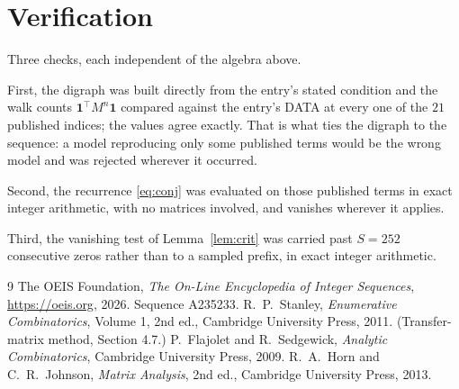 \documentclass[11pt,a4paper]{article}
\theoremstyle{plain}
\theoremstyle{definition}
\begin{document}
\section{Verification}

Three checks, each independent of the algebra above.

First, the digraph was built directly from the entry's stated condition and the walk counts
$\mathbf{1}^{\!\top}M^{n}\mathbf{1}$ compared against the entry's DATA at every one of
the $21$ published indices; the values agree exactly. That is what ties the digraph to
the sequence: a model reproducing only some published terms would be the wrong model and
was rejected wherever it occurred.

Second, the recurrence \eqref{eq:conj} was evaluated on those published terms in exact
integer arithmetic, with no matrices involved, and vanishes wherever it applies.

Third, the vanishing test of Lemma~\ref{lem:crit} was carried past $S=252$ consecutive
zeros rather than to a sampled prefix, in exact integer arithmetic.

\begin{thebibliography}{9}
 The OEIS Foundation, \emph{The On-Line Encyclopedia of Integer
Sequences}, \url{https://oeis.org}, 2026. Sequence A235233.
 R.~P.~Stanley, \emph{Enumerative Combinatorics}, Volume 1, 2nd ed.,
Cambridge University Press, 2011. (Transfer-matrix method, Section 4.7.)
 P.~Flajolet and R.~Sedgewick, \emph{Analytic Combinatorics}, Cambridge
University Press, 2009.
 R.~A.~Horn and C.~R.~Johnson, \emph{Matrix Analysis}, 2nd ed., Cambridge
University Press, 2013.
\end{thebibliography}
\end{document}
